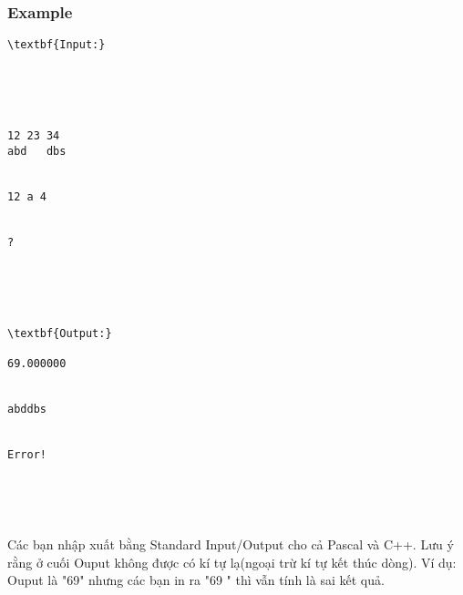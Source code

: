 \subsubsection{   Example  }
\begin{verbatim}
\textbf{Input:}





12 23 34
abd   dbs


12 a 4 


?





\textbf{Output:}

69.000000


abddbs


Error! 





\end{verbatim}

Các bạn nhập xuất bằng Standard Input/Output cho cả Pascal và C++. Lưu ý rằng ở cuối Ouput không được có kí tự lạ(ngoại trừ kí tự kết thúc dòng). Ví dụ: Ouput là "69" nhưng các bạn in ra "69 " thì vẫn tính là sai kết quả.

